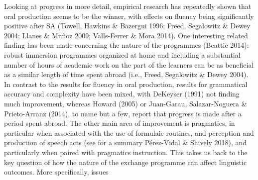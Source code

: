 \begin{styleStandard}
Looking at progress in more detail, empirical research has repeatedly shown that oral production seems to be the winner, with effects on fluency being significantly positive after SA (Towell, Hawkins \& Bazergui 1996; Freed, Segalowitz \& Dewey 2004; Llanes \& Muñoz 2009; Valls-Ferrer \& Mora 2014). One interesting related finding has been made concerning the nature of the programmes (Beattie 2014): robust immersion programmes organized at home and including a substantial number of hours of academic work on the part of the learners can be as beneficial as a similar length of time spent abroad (i.e., Freed, Segalowitz \& Dewey 2004). In contrast to the results for fluency in oral production, results for grammatical accuracy and complexity have been mixed, with DeKeyser (1991) not finding much improvement, whereas Howard (2005) or Juan-Garau, Salazar-Noguera \& Prieto-Arranz (2014), to name but a few, report that progress is made after a period spent abroad. The other main area of improvement is pragmatics, in particular when associated with the use of formulaic routines, and perception and production of speech acts (see for a summary Pérez-Vidal \& Shively 2018), and particularly when paired with pragmatics instruction. This takes us back to the key question of how the nature of the exchange programme can affect linguistic outcomes. More specifically, issues %
%

\end{styleStandard}
